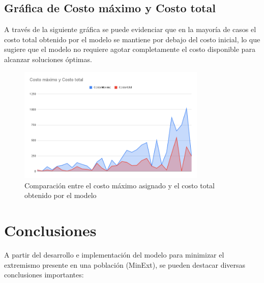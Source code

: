 \documentclass[11pt,letter]{article}
\begin{document}
\subsection{Gráfica de Costo máximo y Costo total}


A través de la siguiente gráfica se puede evidenciar que en la mayoría de casos el costo total obtenido por el modelo se mantiene por debajo del costo inicial, lo que sugiere que el modelo no requiere agotar completamente el costo disponible para alcanzar soluciones óptimas.


\begin{figure}[H]
    \centering
    \includegraphics[width=0.8\textwidth]{resources/costomaximoycostototal.png}
    \caption{Comparación entre el costo máximo asignado y el costo total obtenido por el modelo}
\end{figure}



\section{Conclusiones}

A partir del desarrollo e implementación del modelo para minimizar el extremismo presente en una población (MinExt), se pueden destacar diversas conclusiones importantes:
\end{document}
